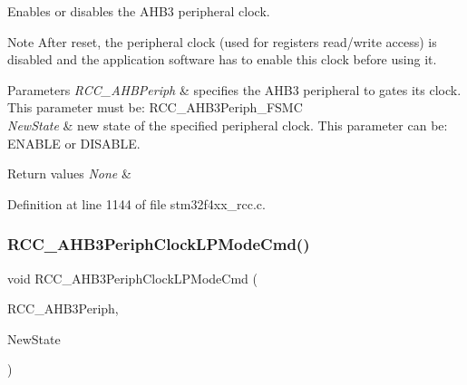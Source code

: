 Enables or disables the A\+H\+B3 peripheral clock. 

\begin{DoxyNote}{Note}
After reset, the peripheral clock (used for registers read/write access) is disabled and the application software has to enable this clock before using it. 
\end{DoxyNote}

\begin{DoxyParams}{Parameters}
{\em R\+C\+C\+\_\+\+A\+H\+B\+Periph} & specifies the A\+H\+B3 peripheral to gates its clock. This parameter must be\+: R\+C\+C\+\_\+\+A\+H\+B3\+Periph\+\_\+\+F\+S\+MC \\
\hline
{\em New\+State} & new state of the specified peripheral clock. This parameter can be\+: E\+N\+A\+B\+LE or D\+I\+S\+A\+B\+LE. \\
\hline
\end{DoxyParams}

\begin{DoxyRetVals}{Return values}
{\em None} & \\
\hline
\end{DoxyRetVals}


Definition at line 1144 of file stm32f4xx\+\_\+rcc.\+c.

\mbox{\label{group___r_c_c___group3_ga4e1df07cdfd81c068902d9d35fcc3911}} 
\subsubsection{\texorpdfstring{R\+C\+C\+\_\+\+A\+H\+B3\+Periph\+Clock\+L\+P\+Mode\+Cmd()}{RCC\_AHB3PeriphClockLPModeCmd()}}
{\footnotesize\ttfamily void R\+C\+C\+\_\+\+A\+H\+B3\+Periph\+Clock\+L\+P\+Mode\+Cmd (\begin{DoxyParamCaption}\item[{uint32\+\_\+t}]{R\+C\+C\+\_\+\+A\+H\+B3\+Periph,  }\item[{Functional\+State}]{New\+State }\end{DoxyParamCaption})}



